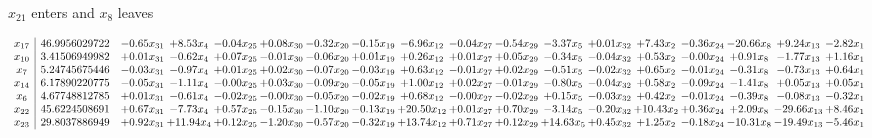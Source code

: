 \documentclass[9pt]{article}
\begin{document}
 $ x_{21} $ enters and $ x_{8} $ leaves 

 \[\begin{array}{c| c c@{\hskip 2pt} c@{\hskip 2pt} c@{\hskip 2pt} c@{\hskip 2pt} c@{\hskip 2pt} c@{\hskip 2pt} c@{\hskip 2pt} c@{\hskip 2pt} c@{\hskip 2pt} c@{\hskip 2pt} c@{\hskip 2pt} c@{\hskip 2pt} c@{\hskip 2pt} c@{\hskip 2pt} c@{\hskip 2pt} c@{\hskip 2pt} }
 x_{17}   &  46.9956029722 & -0.65 x_{31} & +  8.53 x_{4} & -0.04 x_{25} & +  0.08 x_{30} & -0.32 x_{20} & -0.15 x_{19} & -6.96 x_{12} & -0.04 x_{27} & -0.54 x_{29} & -3.37 x_{5} & +  0.01 x_{32} & +  7.43 x_{2} & -0.36 x_{24} & -20.66 x_{8} & +  9.24 x_{13} & -2.82 x_{1}\\
 x_{10}   &  3.41506949982 & +  0.01 x_{31} & -0.62 x_{4} & +  0.07 x_{25} & -0.01 x_{30} & -0.06 x_{20} & +  0.01 x_{19} & +  0.26 x_{12} & +  0.01 x_{27} & +  0.05 x_{29} & -0.34 x_{5} & -0.04 x_{32} & +  0.53 x_{2} & -0.00 x_{24} & +  0.91 x_{8} & -1.77 x_{13} & +  1.16 x_{1}\\
 x_{7}   &  5.24745675446 & -0.03 x_{31} & -0.97 x_{4} & +  0.01 x_{25} & +  0.02 x_{30} & -0.07 x_{20} & -0.03 x_{19} & +  0.63 x_{12} & -0.01 x_{27} & +  0.02 x_{29} & -0.51 x_{5} & -0.02 x_{32} & +  0.65 x_{2} & -0.01 x_{24} & -0.31 x_{8} & -0.73 x_{13} & +  0.64 x_{1}\\
 x_{14}   &  6.17890220775 & -0.05 x_{31} & -1.11 x_{4} & -0.00 x_{25} & +  0.03 x_{30} & -0.09 x_{20} & -0.05 x_{19} & +  1.00 x_{12} & +  0.02 x_{27} & -0.01 x_{29} & -0.80 x_{5} & -0.04 x_{32} & +  0.58 x_{2} & -0.09 x_{24} & -1.41 x_{8} & +  0.05 x_{13} & +  0.05 x_{1}\\
 x_{6}   &  4.67748812785 & +  0.01 x_{31} & -0.61 x_{4} & -0.02 x_{25} & -0.00 x_{30} & -0.05 x_{20} & -0.02 x_{19} & +  0.68 x_{12} & -0.00 x_{27} & -0.02 x_{29} & +  0.15 x_{5} & -0.03 x_{32} & +  0.42 x_{2} & -0.01 x_{24} & -0.39 x_{8} & -0.08 x_{13} & -0.32 x_{1}\\
 x_{22}   &  45.6224508691 & +  0.67 x_{31} & -7.73 x_{4} & +  0.57 x_{25} & -0.15 x_{30} & -1.10 x_{20} & -0.13 x_{19} & + 20.50 x_{12} & +  0.01 x_{27} & +  0.70 x_{29} & -3.14 x_{5} & -0.20 x_{32} & + 10.43 x_{2} & +  0.36 x_{24} & +  2.09 x_{8} & -29.66 x_{13} & +  8.46 x_{1}\\
 x_{23}   &  29.8037886949 & +  0.92 x_{31} & + 11.94 x_{4} & +  0.12 x_{25} & -1.20 x_{30} & -0.57 x_{20} & -0.32 x_{19} & + 13.74 x_{12} & +  0.71 x_{27} & +  0.12 x_{29} & + 14.63 x_{5} & +  0.45 x_{32} & +  1.25 x_{2} & -0.18 x_{24} & -10.31 x_{8} & -19.49 x_{13} & -5.46 x_{1}\\

\end{array}\]
\end{document}
